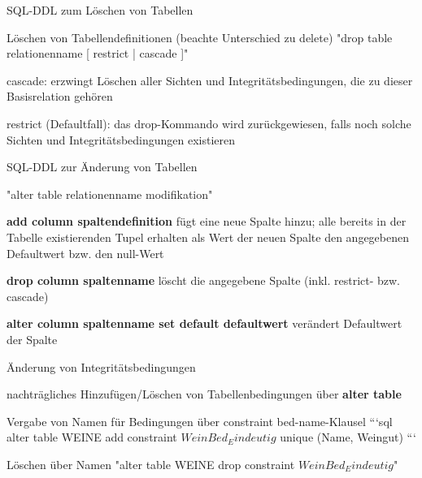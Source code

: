 \documentclass[a4paper]{article}
\begin{document}
\begin{multicols}{3}
\begin{itemize*}
        \begin{itemize*}
            \item SQL-DDL zum Löschen von Tabellen
            \begin{itemize*}
                \item Löschen von Tabellendefinitionen (beachte Unterschied zu delete)
                "drop table relationenname [ restrict | cascade ]"
                \item cascade: erzwingt Löschen aller Sichten und Integritätsbedingungen, die zu dieser Basisrelation gehören
                \item restrict (Defaultfall): das drop-Kommando wird zurückgewiesen, falls noch solche Sichten und Integritätsbedingungen existieren
            \end{itemize*}
            \item SQL-DDL zur Änderung von Tabellen
            \begin{itemize*}
                \item "alter table relationenname modifikation"
                \item \textbf{add column spaltendefinition} fügt eine neue Spalte hinzu; alle bereits in der Tabelle existierenden Tupel erhalten als Wert der neuen Spalte den angegebenen Defaultwert bzw. den null-Wert
                \item \textbf{drop column spaltenname} löscht die angegebene Spalte (inkl. restrict- bzw. cascade)
                \item \textbf{alter column spaltenname set default defaultwert} verändert Defaultwert der Spalte
            \end{itemize*}
            \item Änderung von Integritätsbedingungen
            \begin{itemize*}
                \item nachträgliches Hinzufügen/Löschen von Tabellenbedingungen über \textbf{alter table}
                \item Vergabe von Namen für Bedingungen über constraint bed-name-Klausel
                ```sql
                alter table WEINE
                add constraint $WeinBed_Eindeutig$
                unique (Name, Weingut)
                ```
                \item Löschen über Namen "alter table WEINE drop constraint $WeinBed_Eindeutig$"
            \end{itemize*}
        \end{itemize*}


\end{itemize*}
\end{multicols}
\end{document}
